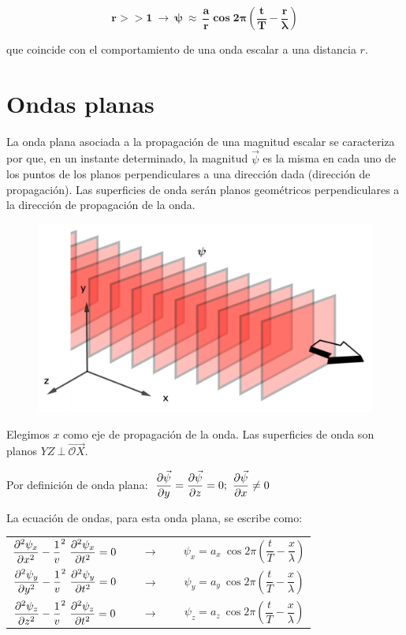 \begin{equation}
\label{ondas-esfericas-grandes-distancias}
\boldsymbol{ r>>1 \ \to \  \psi \ \approx \ \dfrac a r \cos 2\pi \left( \dfrac t T - \dfrac r \lambda \right) }
\end{equation}

que coincide con el comportamiento de una onda escalar a una distancia $r$.

\section{Ondas planas}

La onda plana asociada a la propagación de una magnitud escalar se caracteriza por que, en un instante determinado, la magnitud $\vec \psi$ es la misma en cada uno de los puntos de los planos perpendiculares  a una dirección dada (dirección de propagación). Las superficies de onda serán planos geométricos perpendiculares a la dirección de propagación de la onda.
	\begin{figure}[H]
		\centering
		\includegraphics[width=.8\textwidth]{imagenes/imagenes21/T21IM04.png}
	\end{figure}
Elegimos $x$ como eje de propagación de la onda. Las superficies de onda son planos $YZ\ \bot \ \overrightarrow{\mathcal OX}$.

Por definición de onda plana: $\ \displaystyle \pdv{\vec \psi}{y}=\pdv{\vec \psi}{z}=0;\ \pdv{\vec \psi}{x}\neq 0$

La ecuación de ondas, para esta onda plana, se escribe como:

\begin{table}[H]
\begin{tabular}{ccc}
$\displaystyle \pdv[2]{\psi_x}{x}-\dfrac 1 v^2\ \pdv[2]{\psi_x}{t}=0\quad $ &$ \ \to \ $&$\displaystyle \quad \psi_x=a_x\ \cos 2 \pi \left( \dfrac t T - \dfrac x \lambda \right)$  \\
$\displaystyle \pdv[2]{\psi_y}{y}-\dfrac 1 v^2\ \pdv[2]{\psi_y}{t}=0\quad $ &$ \ \to \ $&$\displaystyle \quad \psi_y=a_y\ \cos 2 \pi  \left( \dfrac t T - \dfrac x \lambda \right)$  \\
$\displaystyle \pdv[2]{\psi_z}{z}-\dfrac 1 v^2\ \pdv[2]{\psi_z}{t}=0\quad $ &$ \ \to \ $&$\displaystyle \quad \psi_z=a_z\ \cos 2 \pi  \left( \dfrac t T - \dfrac x \lambda \right)$  
\end{tabular}
\end{table}


